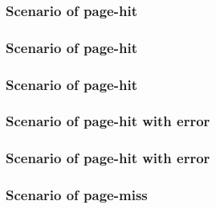 
\begin{frame}
  \frametitle{Scenario of page-hit}

  \begin{center}
  \end{center}

\end{frame}


\begin{frame}
  \frametitle{Scenario of page-hit}

  \begin{center}
  \end{center}

\end{frame}


\begin{frame}
  \frametitle{Scenario of page-hit}

  \begin{center}
  \end{center}

\end{frame}


\begin{frame}
  \frametitle{Scenario of page-hit with error}

  \begin{center}
  \end{center}

\end{frame}


\begin{frame}
  \frametitle{Scenario of page-hit with error}

  \begin{center}
  \end{center}

\end{frame}


\begin{frame}
  \frametitle{Scenario of page-miss}

  \begin{center}
  \end{center}

\end{frame}


